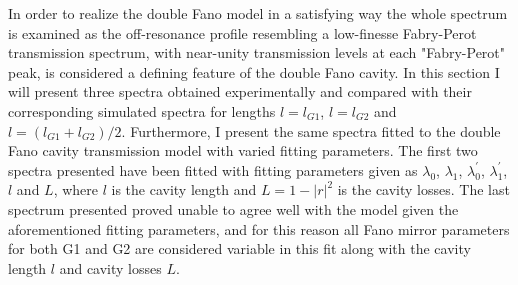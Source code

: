In order to realize the double Fano model in a satisfying way the whole spectrum is examined as the off-resonance profile resembling a low-finesse Fabry-Perot transmission spectrum, with near-unity transmission levels at each "Fabry-Perot" peak, is considered a defining feature of the double Fano cavity. In this section I will present three spectra obtained experimentally and compared with their corresponding simulated spectra for lengths $l=l_{G1}$, $l=l_{G2}$ and $l=(l_{G1} + l_{G2})/2$. Furthermore, I present the same spectra fitted to the double Fano cavity transmission model with varied fitting parameters. The first two spectra presented have been fitted with fitting parameters given as $\lambda_0$, $\lambda_1$, $\lambda_0^{\prime}$, $\lambda_1^{\prime}$, $l$ and $L$, where $l$ is the cavity length and $L = 1-|r|^2$ is the cavity losses. The last spectrum presented proved unable to agree well with the model given the aforementioned fitting parameters, and for this reason all Fano mirror parameters for both G1 and G2 are considered variable in this fit along with the cavity length $l$ and cavity losses $L$.


